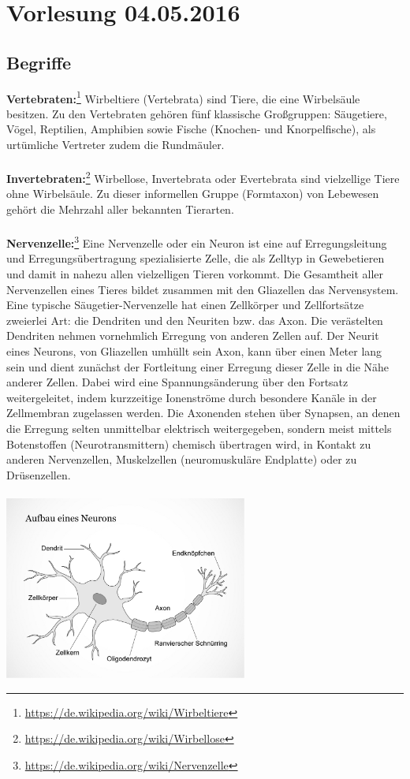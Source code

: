 \section{Vorlesung 04.05.2016}
\subsection{Begriffe}

\textbf{Vertebraten:}\footnote{\url{https://de.wikipedia.org/wiki/Wirbeltiere}} Wirbeltiere (Vertebrata) sind Tiere, die eine Wirbelsäule besitzen. Zu den Vertebraten gehören fünf klassische Großgruppen: Säugetiere, Vögel, Reptilien, Amphibien sowie Fische (Knochen- und Knorpelfische), als urtümliche Vertreter zudem die Rundmäuler.
\\\\
\textbf{Invertebraten:}\footnote{\url{https://de.wikipedia.org/wiki/Wirbellose}} Wirbellose, Invertebrata oder Evertebrata sind vielzellige Tiere ohne Wirbelsäule. Zu dieser informellen Gruppe (Formtaxon) von Lebewesen gehört die Mehrzahl aller bekannten Tierarten.
\\\\
\textbf{Nervenzelle:}\footnote{\url{https://de.wikipedia.org/wiki/Nervenzelle}} Eine Nervenzelle oder ein Neuron ist eine auf Erregungsleitung und Erregungsübertragung spezialisierte Zelle, die als Zelltyp in Gewebetieren und damit in nahezu allen vielzelligen Tieren vorkommt. Die Gesamtheit aller Nervenzellen eines Tieres bildet zusammen mit den Gliazellen das Nervensystem.\\
Eine typische Säugetier-Nervenzelle hat einen Zellkörper und Zellfortsätze zweierlei Art: die Dendriten und den Neuriten bzw. das Axon. Die verästelten Dendriten nehmen vornehmlich Erregung von anderen Zellen auf. Der Neurit eines Neurons, von Gliazellen umhüllt sein Axon, kann über einen Meter lang sein und dient zunächst der Fortleitung einer Erregung dieser Zelle in die Nähe anderer Zellen. Dabei wird eine Spannungsänderung über den Fortsatz weitergeleitet, indem kurzzeitige Ionenströme durch besondere Kanäle in der Zellmembran zugelassen werden.
Die Axonenden stehen über Synapsen, an denen die Erregung selten unmittelbar elektrisch weitergegeben, sondern meist mittels Botenstoffen (Neurotransmittern) chemisch übertragen wird, in Kontakt zu anderen Nervenzellen, Muskelzellen (neuromuskuläre Endplatte) oder zu Drüsenzellen.
\\\\
\includegraphics[width=0.6\textwidth]{lectures/160405/pix/neuron.jpg}

